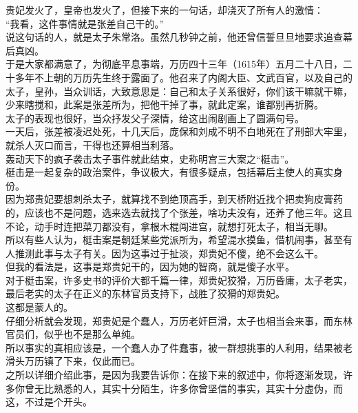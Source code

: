 \begin{multicols}{\theparacolNo}
贵妃发火了，皇帝也发火了，但接下来的一句话，却浇灭了所有人的激情：\\

“我看，这件事情就是张差自己干的。”\\

说这句话的人，就是太子朱常洛。虽然几秒钟之前，他还曾信誓旦旦地要求追查幕后真凶。\\

于是大家都满意了，为彻底平息事端，万历四十三年（1615年）五月二十八日，二十多年不上朝的万历先生终于露面了。他召来了内阁大臣、文武百官，以及自己的太子，皇孙，当众训话，大致意思是：自己和太子关系很好，你们该干嘛就干嘛，少来瞎搅和，此案是张差所为，把他干掉了事，就此定案，谁都别再折腾。\\

太子的表现也很好，当众抒发父子深情，给这出闹剧画上了圆满句号。\\

一天后，张差被凌迟处死，十几天后，庞保和刘成不明不白地死在了刑部大牢里，就杀人灭口而言，干得也还算相当利落。\\

轰动天下的疯子袭击太子事件就此结束，史称明宫三大案之“梃击”。\\

梃击是一起复杂的政治案件，争议极大，有很多疑点，包括幕后主使人的真实身份。\\

因为郑贵妃要想刺杀太子，就算找不到绝顶高手，到天桥附近找个把卖狗皮膏药的，应该也不是问题，选来选去就找了个张差，啥功夫没有，还养了他三年。这且不论，动手时连把菜刀都没有，拿根木棍闯进宫，就想打死太子，相当无聊。\\

所以有些人认为，梃击案是朝廷某些党派所为，希望混水摸鱼，借机闹事，甚至有人推测此事与太子有关。因为这事过于扯淡，郑贵妃不傻，绝不会这么干。\\

但我的看法是，这事是郑贵妃干的，因为她的智商，就是傻子水平。\\

对于梃击案，许多史书的评价大都千篇一律，郑贵妃狡猾，万历昏庸，太子老实，最后老实的太子在正义的东林官员支持下，战胜了狡猾的郑贵妃。\\

这都是蒙人的。\\

仔细分析就会发现，郑贵妃是个蠢人，万历老奸巨滑，太子也相当会来事，而东林官员们，似乎也不是那么单纯。\\

所以事实的真相应该是，一个蠢人办了件蠢事，被一群想挑事的人利用，结果被老滑头万历镇了下来，仅此而已。\\

之所以详细介绍此事，是因为我要告诉你：在接下来的叙述中，你将逐渐发现，许多你曾无比熟悉的人，其实十分陌生，许多你曾坚信的事实，其实十分虚伪，而这，不过是个开头。\\

\ifnum{}
	\end{multicols}
\fi
\newpage
